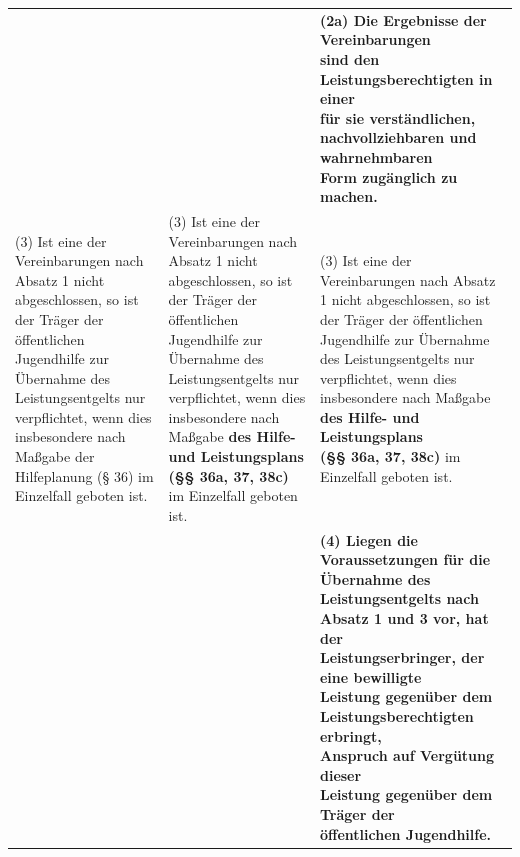 \documentclass[10pt,a4paper,landscape]{article}
\begin{document}
\begin{longtable}{|L{8.2cm}|L{8.2cm}|L{8.2cm}|}
\hhline{|---|}
 &  & \textbf{\textcolor{diffgreen}{(2a) Die Ergebnisse der Vereinbarungen  \newline sind den Leistungsberechtigten in einer  \newline für sie verständlichen,  \newline nachvollziehbaren und wahrnehmbaren  \newline Form zugänglich zu machen.}} \\
\hhline{|---|}
(3) Ist eine der Vereinbarungen nach  \newline Absatz 1 nicht abgeschlossen, so ist der  \newline Träger der öffentlichen Jugendhilfe zur  \newline Übernahme des Leistungsentgelts nur  \newline verpflichtet, wenn dies insbesondere nach  \newline Maßgabe \textcolor{diffred}{der Hilfeplanung (\S{} 36)} im  \newline Einzelfall geboten ist. & (3) Ist eine der Vereinbarungen nach  \newline Absatz 1 nicht abgeschlossen, so ist der  \newline Träger der öffentlichen Jugendhilfe zur  \newline Übernahme des Leistungsentgelts nur  \newline verpflichtet, wenn dies insbesondere nach  \newline Maßgabe \textbf{des Hilfe- und Leistungsplans  \newline (\S{}\S{} 36a, 37, 38c)} im Einzelfall geboten ist. & (3) Ist eine der Vereinbarungen nach  \newline Absatz 1 nicht abgeschlossen, so ist der  \newline Träger der öffentlichen Jugendhilfe zur  \newline Übernahme des Leistungsentgelts nur  \newline verpflichtet, wenn dies insbesondere nach  \newline Maßgabe \textbf{des Hilfe- und Leistungsplans  \newline (\S{}\S{} 36a, 37, 38c)} im Einzelfall geboten ist. \\
\hhline{|---|}
 &  & \textbf{\textcolor{diffgreen}{(4) Liegen die Voraussetzungen für die  \newline Übernahme des Leistungsentgelts nach  \newline Absatz 1 und 3 vor, hat der  \newline Leistungserbringer, der eine bewilligte  \newline Leistung gegenüber dem  \newline Leistungsberechtigten erbringt,  \newline Anspruch auf Vergütung dieser  \newline Leistung gegenüber dem Träger der  \newline öffentlichen Jugendhilfe.}} \\

\end{longtable}
\end{document}
